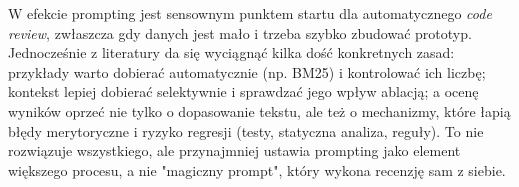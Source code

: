 W efekcie prompting jest sensownym punktem startu dla automatycznego \emph{code review}, zwłaszcza 
gdy danych jest mało i trzeba szybko zbudować prototyp. Jednocześnie z literatury 
da się wyciągnąć kilka dość konkretnych zasad: przykłady warto dobierać automatycznie (np. 
BM25) i kontrolować ich liczbę; kontekst lepiej dobierać selektywnie i 
sprawdzać jego wpływ ablacją; a ocenę wyników oprzeć nie tylko o dopasowanie 
tekstu, ale też o mechanizmy, które łapią błędy merytoryczne i ryzyko regresji 
(testy, statyczna analiza, reguły). To nie rozwiązuje wszystkiego, ale przynajmniej ustawia prompting 
jako element większego procesu, a nie "magiczny prompt", który wykona recenzję sam 
z siebie.